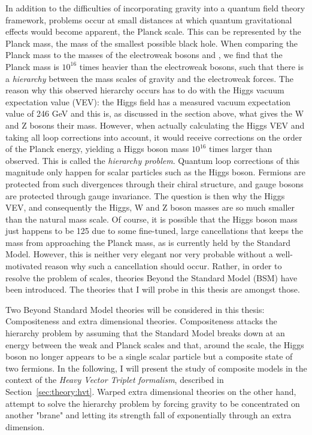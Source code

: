 In addition to the difficulties of incorporating gravity into a quantum field theory framework, problems occur at small distances at which quantum gravitational effects would become apparent, the Planck scale. This can be represented by the Planck mass, the mass of the smallest possible black hole. When comparing the Planck mass to the masses of the electroweak bosons \PW and \PZ, we find that the Planck mass is $10^{16}$ times heavier than the electroweak bosons, such that there is a \emph{hierarchy} between the mass scales of gravity and the electroweak forces. The reason why this observed hierarchy occurs has to do with the Higgs vacuum expectation value (VEV): the Higgs field has a measured vacuum expectation value of 246 GeV and this is, as discussed in the section above, what gives the W and Z bosons their mass. However, when actually calculating the Higgs VEV and taking all loop corrections into account, it would receive corrections on the order of the Planck energy, yielding a Higgs boson mass $10^{16}$ times larger than observed. This is called the \emph{hierarchy problem}.
Quantum loop corrections of this magnitude only happen for scalar particles such as the Higgs boson. Fermions are protected from such divergences through their chiral structure, and gauge bosons are protected through gauge invariance. The question is then why the Higgs VEV, and consequently the Higgs, W and Z boson masses are so much smaller than the natural mass scale.\newline
Of course, it is possible that the Higgs boson mass just happens to be 125 \GeV due to some fine-tuned, large cancellations that keeps the mass from approaching the Planck mass, as is currently held by the Standard Model. However, this is neither very elegant nor very probable without a well-motivated reason why such a cancellation should occur. Rather, in order to resolve the problem of scales, theories Beyond the Standard Model (BSM) have been introduced. The theories that I will probe in this thesis are amongst those.\par
Two Beyond Standard Model theories will be considered in this thesis: Compositeness and extra dimensional theories.
Compositeness attacks the hierarchy problem by assuming that the Standard Model breaks down at an energy between the weak and Planck scales and that, around the \TeV scale, the Higgs boson no longer appears to be a single scalar particle but a composite state of two fermions. In the following, I will present the study of composite models in the context of the \emph{Heavy Vector Triplet formalism}, described in Section~\ref{sec:theory:hvt}. Warped extra dimensional theories on the other hand, attempt to solve the hierarchy problem by forcing gravity to be concentrated on another "brane" and letting its strength fall of exponentially through an extra dimension.

